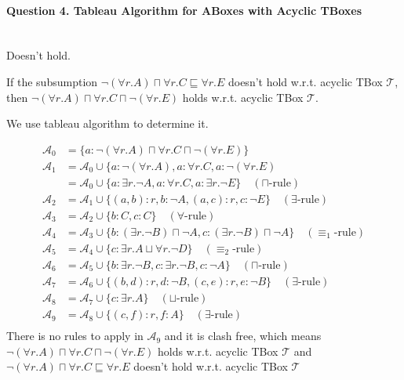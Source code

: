 \documentclass[12pt]{article}
\begin{document}
    \paragraph{Question 4. Tableau Algorithm for ABoxes with Acyclic TBoxes}~{}
    \\

    Doesn't hold. \par
    If the subsumption $\neg(\forall r . A) \sqcap \forall r . C \sqsubseteq \forall r . E$ doesn't hold w.r.t. acyclic TBox $\mathcal{T}$, then $\neg(\forall r . A) \sqcap \forall r . C \sqcap \neg(\forall r . E)$ holds w.r.t. acyclic TBox $\mathcal{T}$. \par
    We use tableau algorithm to determine it.\par
    \begin{equation}
        \begin{aligned}
            \mathcal{A}_{0} &=\{a: \neg(\forall r . A) \sqcap \forall r . C \sqcap \neg(\forall r . E)\} \\
            \mathcal{A}_{1} &=\mathcal{A}_{0} \cup\{a: \neg(\forall r . A), a: \forall r . C, a: \neg(\forall r . E) \\ & =\mathcal{A}_{0} \cup\{a: \exists r . \neg A, a: \forall r . C, a: \exists r . \neg E\} \quad (\sqcap \text{-rule}) \\
            \mathcal{A}_{2}&=\mathcal{A}_{1} \cup\{(a, b): r, b: \neg A,(a, c): r, c: \neg E\} \quad(\exists \text{-rule})\\
            \mathcal{A}_{3} &=\mathcal{A}_{2} \cup\{b: C, c: C\} \quad(\forall\text{-rule})\\
            \mathcal{A}_{4}&=\mathcal{A}_{3} \cup\{b:(\exists r . \neg B) \sqcap \neg A, c:(\exists r . \neg B) \sqcap \neg A\} \quad(\equiv_{1}\text{-rule})\\
            \mathcal{A}_{5}&=\mathcal{A}_{4} \cup\{c: \exists r . A \sqcup \forall r . \neg D\} \quad(\equiv_{2}\text{-rule})\\
            \mathcal{A}_{6}&=\mathcal{A}_{5} \cup\{b: \exists r . \neg B, c: \exists r . \neg B, c: \neg A\} \quad (\sqcap \text{-rule})\\
            \mathcal{A}_{7}&=\mathcal{A}_{6} \cup\{(b, d): r, d: \neg B,(c, e): r, e: \neg B\} \quad(\exists \text{-rule})\\
            \mathcal{A}_{8}&=\mathcal{A}_{7} \cup\{c: \exists r . A\} \quad (\sqcup\text{-rule})  \\
            \mathcal{A}_{9}&=\mathcal{A}_{8} \cup\{(c, f): r, f: A\} \quad(\exists \text{-rule})\\
            \nonumber
        \end{aligned}
    \end{equation}
    There is no rules to apply in $\mathcal{A}_9$ and it is clash free, which means $\neg(\forall r . A) \sqcap \forall r . C \sqcap \neg(\forall r . E)$ holds w.r.t. acyclic TBox $\mathcal{T}$ and $\neg(\forall r . A) \sqcap \forall r . C \sqsubseteq \forall r . E$ doesn't hold w.r.t. acyclic TBox $\mathcal{T}$
\end{document}
